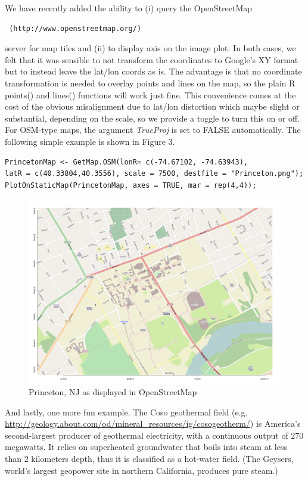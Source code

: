 \documentclass{article}
\begin{document}
\noindent We have recently added the ability to (i) query the OpenStreetMap \begin{verbatim} (http://www.openstreetmap.org/) \end{verbatim} server for map tiles and (ii) to display axis on the image plot. In both cases, we felt that it was sensible to not transform the coordinates to Google's XY format but to instead leave the lat/lon coords as is. The advantage is that no coordinate transformation is needed to overlay points and lines on the map, so the plain R points() and lines() functions will work just fine. This convenience comes at the cost of the obvious misalignment due to lat/lon distortion which maybe slight or substantial, depending on the scale, so we provide a toggle to turn this on or off.
For OSM-type maps, the argument {\it TrueProj} is set to FALSE automatically.  
The following simple example is shown in Figure 3.

\begin{verbatim}
PrincetonMap <- GetMap.OSM(lonR= c(-74.67102, -74.63943), 
latR = c(40.33804,40.3556), scale = 7500, destfile = "Princeton.png");
PlotOnStaticMap(PrincetonMap, axes = TRUE, mar = rep(4,4));
\end{verbatim}
\begin{figure}[thb]
\centering
   \includegraphics[width = .975 \textwidth]{Princeton.png}
    \caption{Princeton, NJ as displayed in OpenStreetMap}
\end{figure}

\noindent And lastly, one more fun example. The Coso geothermal field (e.g. \url{http://geology.about.com/od/mineral_resources/ig/cosogeotherm/}) is America's second-largest producer of geothermal electricity, with a continuous output of 270 megawatts. It relies on superheated groundwater that boils into steam at less than 2 kilometers depth, thus it is classified as a hot-water field. (The Geysers, world's largest geopower site in northern California, produces pure steam.)
\end{document}
